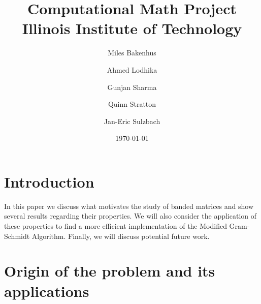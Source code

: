 \documentclass{article}
\title{Computational Math Project\\
  {\large Illinois Institute of Technology}
}
\author{
  Miles Bakenhus 
  \and
  Ahmed Lodhika 
  \and
  Gunjan Sharma 
  \and
  Quinn Stratton 
  \and
  Jan-Eric Sulzbach 
}
\date{\today}
\numberwithin{pic}{section}
\numberwithin{lem}{section}
\numberwithin{thm}{section}
\numberwithin{cor}{section}
\theoremstyle{definition}
\numberwithin{ex}{section}
\numberwithin{defn}{section}
\theoremstyle{definition}
\theoremstyle{remark}
\newlength\tindent
\renewcommand{\indent}{\hspace*{\tindent}}
\begin{document}
\fancyhead[l]{}
\fancyhead[c]{}
\fancyhead[r]{}
\maketitle
\newpage
\tableofcontents
\section{Introduction}
\indent In this paper we discuss what motivates the study of banded matrices and show several results regarding their properties. We will also consider the application of these properties to find a more efficient implementation of the Modified Gram-Schmidt Algorithm. Finally, we will discuss potential future work.
\section{Origin of the problem and its applications}
\end{document}

